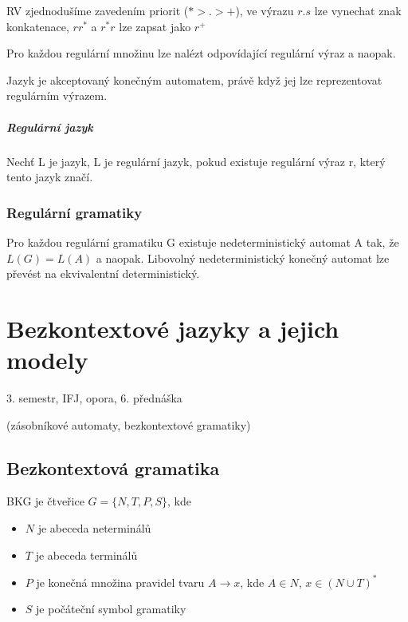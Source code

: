 \documentclass[a4paper, 11pt]{report}
\begin{document}
RV zjednodušíme zavedením priorit ($* > . > +$), ve výrazu $r.s$ lze vynechat znak konkatenace, $rr^*$ a $r^*r$ lze zapsat jako $r^+$

Pro každou regulární množinu lze nalézt odpovídající regulární výraz a naopak.

Jazyk je akceptovaný konečným automatem, právě když jej lze reprezentovat regulárním výrazem.

\paragraph{Regulární jazyk}
Nechť L je jazyk, L je regulární jazyk, pokud existuje regulární výraz r, který tento jazyk značí.

\subsection{Regulární gramatiky}
Pro každou regulární gramatiku G existuje nedeterministický automat A tak, že $L(G) = L(A)$ a naopak. Libovolný nedeterministický konečný automat lze převést na ekvivalentní deterministický.




























\chapter{Bezkontextové jazyky a jejich modely} \label{cha:21}

3. semestr, IFJ, opora, 6. přednáška

(zásobníkové automaty, bezkontextové gramatiky)


\section{Bezkontextová gramatika}

BKG je čtveřice $G = \{N, T, P, S\}$, kde
\begin{itemize}
	\item $N$ je abeceda neterminálů
	\item $T$ je abeceda terminálů
	\item $P$ je konečná množina pravidel tvaru $A \to x$, kde $A \in N$, $x \in (N \cup T)^*$
	\item $S$ je počáteční symbol gramatiky
\end{itemize}
\end{document}
